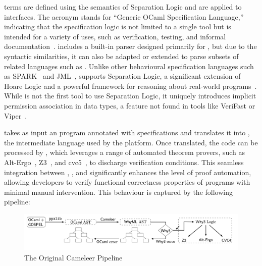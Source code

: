 \gospel terms are defined using the semantics of Separation Logic and are applied to \ocaml interfaces. The acronym \gospel stands 
for “Generic OCaml Specification Language,” indicating that the specification logic is not limited to a single tool but is intended 
for a variety of uses, such as verification, testing, and informal documentation~\cite{ChargueraudFLP19}. \gospel includes a built-in 
parser designed primarily for \ocaml, but due to the syntactic similarities, it can also be adapted or extended to parse subsets of 
related languages such as \cml. Unlike other behavioural specification languages such as \textsf{SPARK}~\cite{SPARK} and 
\textsf{JML}~\cite{article}, \gospel 
supports Separation Logic, a significant extension of Hoare Logic and a powerful framework for reasoning about real-world 
programs~\cite{Reynolds02, OHearnRY01}. While \gospel is not the first tool to use Separation Logic, it uniquely introduces implicit 
permission association in data types, a feature not found in tools like \textsf{VeriFast} or \textsf{Viper}~\cite{ChargueraudFLP19}.

\cameleer takes as input an \ocaml program annotated with \gospel specifications and translates it into \whyml, the intermediate 
language used by the \whythree platform. Once translated, the code can be processed by \whythree, which leverages a range of automated 
theorem provers, such as Alt-Ergo~\cite{ConchonIM17}, Z3~\cite{MouraB08}, and cvc5~\cite{BarbosaBBKLMMMN22}, to discharge verification 
conditions. This seamless integration between \cameleer, 
\gospel, and \whythree significantly enhances the level of proof automation, allowing developers to verify functional correctness 
properties of \ocaml programs with minimal manual intervention. This behaviour is captured by the following pipeline:

\begin{figure}[H]
    \centering
    \includegraphics[width=\linewidth]{images/Cameleer_From_Paper.png}
    \caption{The Original Cameleer Pipeline~\cite{PereiraR20}}
    \label{fig:CameleerPipeline}
\end{figure}

